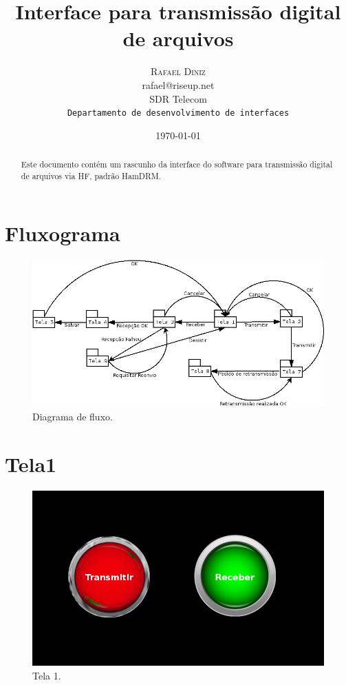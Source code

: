 \documentclass[11pt,a4paper]{article}
\title{Interface para transmissão digital de arquivos}
\author{
       \large
        \textsc{Rafael Diniz}
        \mbox{}\\ %
        rafael@riseup.net\\
        \mbox{} %
        SDR Telecom\\
        \mbox{} %
        \normalsize
        \texttt{Departamento de desenvolvimento de interfaces}\\
}
\date{\today}
\begin{document}
\maketitle

\begin{abstract}

Este documento contém um rascunho da interface do software para transmissão
digital de arquivos via HF, padrão HamDRM.

\end{abstract}

\newpage


\section{Fluxograma}

\begin{figure}[H]
  \centering
  \hspace*{-1cm}
  \includegraphics[scale=0.7]{Diagram.png}
  \caption{Diagrama de fluxo.}
  \label{f0}
\end{figure}

\section{Tela1}

\begin{figure}[H]
  \centering
  \hspace*{-1.5cm}
  \includegraphics[scale=0.7]{Tela1.png}
  \caption{Tela 1.}
  \label{Tela1}
\end{figure}
\end{document}
